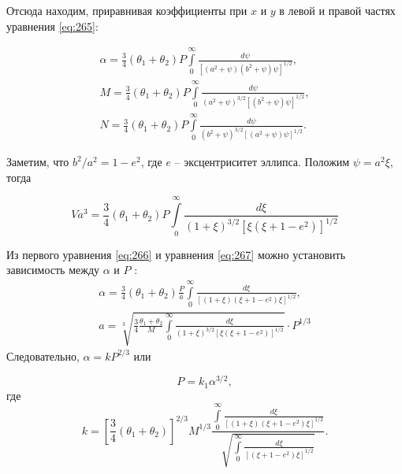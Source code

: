 \documentclass[specialist, subf, href, colorlinks=true, 14pt, final]{disser}
\theoremstyle{definition}
\begin{document}
Отсюда находим, приравнивая коэффициенты при $x$ и $y$ в левой и правой частях уравнения \eqref{eq:265}:
  \addtocounter{equation}{1}
  \begin{equation}\label{eq:266}
    \begin{array}{l}
      \alpha = \frac{3}{4}(\theta_1 + \theta_2)P \int \limits_0^{\infty}\displaystyle \frac{d \psi}{\left[(a^2 + \psi)(b^2 + \psi)\psi\right]^{1/2}},\\
      M = \frac{3}{4}(\theta_1 + \theta_2)P \int \limits_0^{\infty}\displaystyle \frac{d \psi}{(a^2 + \psi)^{3/2}\left[(b^2 + \psi)\psi\right]^{1/2}},\\
      N = \frac{3}{4}(\theta_1 + \theta_2)P \int \limits_0^{\infty}\displaystyle \frac{d \psi}{(b^2 + \psi)^{3/2}\left[(a^2 + \psi)\psi\right]^{1/2}}.
    \end{array}
    \tag{6}
  \end{equation}
  
Заметим, что $b^2/a^2 = 1 - e^2$, где $e$ -- эксцентриситет эллипса. Положим $\psi = a^2 \xi$, тогда
\addtocounter{equation}{1}
\begin{equation}\label{eq:267}
   V a^3 = \frac{3}{4}(\theta_1 + \theta_2)P \int \limits_0^{\infty}\displaystyle \frac{d \xi}{(1 + \xi)^{3/2}\left[\xi(\xi + 1 - e^2)\right]^{1/2}}
    \tag{7}
\end{equation}
  
  Из первого уравнения \eqref{eq:266} и уравнения \eqref{eq:267} можно установить зависимость между $\alpha$ и $P$ :
  \[ 
  \begin{array}{l}
    \alpha = \displaystyle \frac{3}{4}(\theta_1 + \theta_2) \displaystyle \frac{P}{a} \int \limits_0^{\infty} \displaystyle \frac{d \xi}{\left[(1 + \xi)(\xi + 1 - e^2)\xi\right]^{1/2}},\\
    a = \sqrt[\displaystyle 3]{\displaystyle \frac{3}{4} \frac{\theta_1 + \theta_2}{M} \int\limits_0^{\infty} \displaystyle \frac{d \xi}{(1 + \xi)^{3/2}\left[\xi(\xi + 1 - e^2)\right]^{1/2}} } \cdot P^{1/3}
  \end{array}
  \]
  Следовательно, $\alpha = k P^{2/3}$ или 
  \addtocounter{equation}{1}
  \begin{equation}\label{eq:268}
   P = k_1\alpha^{3/2},
    \tag{8}
  \end{equation}
  где
  \[ 
    k = \left[ \frac{3}{4}(\theta_1 + \theta_2) \right]^{2/3} M^{1/3} \frac{ \displaystyle \int\limits_0^{\infty} \frac{d \xi}{\left[(1 + \xi)(\xi + 1 - e^2)\xi\right]^{1/2}} }{\displaystyle \sqrt{\int\limits_0^{\infty} \frac{d \xi}{\left[(\xi + 1 - e^2)\xi\right]^{1/2}}}}.
   \]
\end{document}
